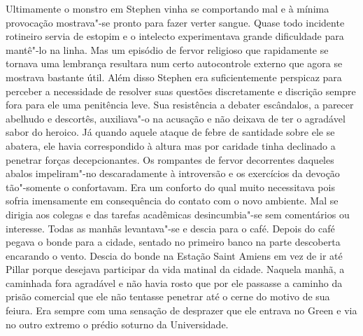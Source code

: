Ultimamente o monstro em Stephen vinha se comportando mal e à mínima
provocação mostrava"-se pronto para fazer verter sangue.  Quase todo
incidente rotineiro servia de estopim e o intelecto experimentava
grande dificuldade para mantê"-lo na linha.  Mas um episódio de fervor
religioso que rapidamente se tornava uma lembrança resultara num certo
autocontrole externo que agora se mostrava bastante útil.  Além disso
Stephen era suficientemente perspicaz para perceber a necessidade de
resolver suas questões discretamente e discrição sempre fora para ele
uma penitência leve.  Sua resistência a debater escândalos, a parecer
abelhudo e descortês, auxiliava"-o na acusação e não deixava de ter o
agradável sabor do heroico.  Já quando aquele ataque de febre de
santidade sobre ele se abatera, ele havia correspondido à altura mas
por caridade tinha declinado a penetrar forças decepcionantes.  Os
rompantes de fervor decorrentes daqueles abalos impeliram"-no
descaradamente à introversão e os exercícios da devoção tão"-somente o
confortavam.  Era um conforto do qual muito necessitava pois sofria
imensamente em consequência do contato com o novo ambiente.  Mal se
dirigia aos colegas e das tarefas acadêmicas desincumbia"-se sem
comentários ou interesse.  Todas as manhãs levantava"-se e descia para o
café.  Depois do café pegava o bonde para a cidade, sentado no primeiro
banco na parte descoberta encarando o vento.  Descia do bonde na
Estação Saint Amiens em vez de ir até Pillar porque desejava participar
da vida matinal da cidade.  Naquela manhã, a caminhada fora agradável e
não havia rosto que por ele passasse a caminho da prisão comercial que
ele não tentasse penetrar até o cerne do motivo de sua feiura.  Era
sempre com uma sensação de desprazer que ele entrava no Green e via no
outro extremo o prédio soturno da Universidade.

